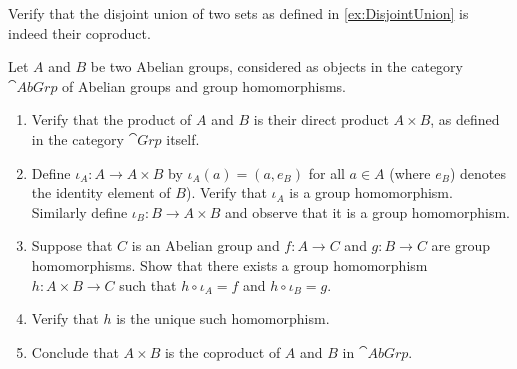 
\begin{Exercise}
Verify that the disjoint union of two sets as defined in \cref{ex:DisjointUnion} is indeed their coproduct.
\end{Exercise}

\begin{Exercise}
Let $A$ and $B$ be two Abelian groups, considered as objects in the category $\cat{AbGrp}$ of Abelian groups and group homomorphisms.
\begin{enumerate}
\item Verify that the product of $A$ and $B$ is their direct product $A \times B$, as defined in the category $\cat{Grp}$ itself.

\item Define $\iota_A \colon A \to A \times B$ by $\iota_A(a) = (a, e_B)$ for all $a \in A$ (where $e_B$) denotes the identity element of $B$). Verify that $\iota_A$ is a group homomorphism. Similarly define $\iota_B \colon B \to A \times B$ and observe that it is a group homomorphism.

\item Suppose that $C$ is an Abelian group and $f \colon A \to C$ and $g \colon B \to C$ are group homomorphisms. Show that there exists a group homomorphism $h \colon A \times B \to C$ such that $h \circ \iota_A = f$ and $h \circ \iota_B = g$.


\item Verify that $h$ is the unique such homomorphism.

\item Conclude that $A \times B$ is the coproduct of $A$ and $B$ in $\cat{AbGrp}$.
\end{enumerate}
\end{Exercise}


